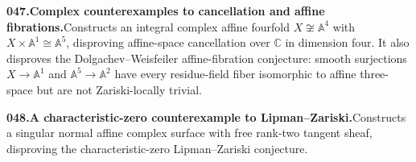 \documentclass[11pt,a4paper]{article}
\begin{document}
  \par \begin{minipage}{\linewidth}
  \fontsize{10.5}{12.6}\selectfont\RaggedRight
  \hypertarget{result 047}{}
  {\bfseries\textcolor{muted}{047.}\enspace Complex counterexamples to cancellation and affine fibrations.}\enspace Constructs an integral complex affine fourfold $X\not\cong\mathbb A^4$ with $X\times\mathbb A^1\cong\mathbb A^5$, disproving affine-space cancellation over $\mathbb C$ in dimension four. It also disproves the Dolgachev--Weisfeiler affine-fibration conjecture: smooth surjections $X\to\mathbb A^1$ and $\mathbb A^5\to\mathbb A^2$ have every residue-field fiber isomorphic to affine three-space but are not Zariski-locally trivial.\par
  \end{minipage}\par\vspace{5pt}



  \par \begin{minipage}{\linewidth}
  \fontsize{10.5}{12.6}\selectfont\RaggedRight
  \hypertarget{result 048}{}
  {\bfseries\textcolor{muted}{048.}\enspace A characteristic-zero counterexample to Lipman--Zariski.}\enspace Constructs a singular normal affine complex surface with free rank-two tangent sheaf, disproving the characteristic-zero Lipman--Zariski conjecture.\par
  \end{minipage}\par\vspace{5pt}
\end{document}
